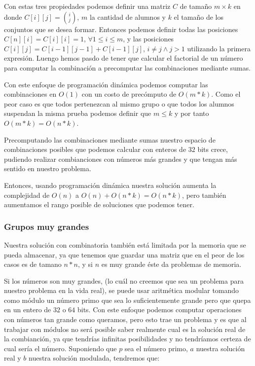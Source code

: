 \documentclass{article}
\begin{document}
Con estas tres propiedades podemos definir una matriz $C$ de tamaño $m \times k$ en donde $C[i][j] = {i \choose j}$, $m$ la cantidad de alumnos y $k$ el tamaño de los conjuntos que se desea formar. Entonces podemos definir todas las posiciones $C[n][i] = C[i][i] = 1$, $\forall 1 \leq i \leq m$, y las posiciones $C[i][j] = C[i - 1][j - 1] + C[i - 1][j]$, $i \neq j \land j > 1$ utilizando la primera expresión. Luengo hemos pasdo de tener que calcular el factorial de un número para computar la combinación a precomputar las combinaciones mediante sumas. 

Con este enfoque de programación dinámica podemos computar las combinaciones en $O(1)$ con un costo de precómputo de $O(m*k)$. Como el peor caso es que todos pertenezcan al mismo grupo o que todos los alumnos suspendan la misma prueba podemos definir que $m \leq k$ y por tanto $O(m*k) = O(n*k)$. 

Precomputando las combinaciones mediante sumas nuestro espacio de combinaciones posibles que podemos calcular con enteros de $32$ bits crece, pudiendo realizar combianciones con números más grandes y que tengan más sentido en nuestro problema.  

Entonces, usando programación dinámica nuestra solución aumenta la complejidad de $O(n)$ a $O(n) + O(n*k) = O(n*k)$, pero también aumentamos el rango posible de soluciones que podemos tener.

\subsubsection{Grupos muy grandes}

Nuestra solución con combinatoria también está limitada por la memoria que se pueda almacenar, ya que tenemos que guardar una matriz que en el peor de los casos es de tamano $n*n$, y si $n$ es muy grande éste da problemas de memoria.

Si los números son muy grandes, (lo cuál no creemos que sea un problema para nuestro problema en la vida real), se puede usar aritmética modular tomando como módulo un número primo que sea lo suficientemente grande pero que quepa en un entero de $32$ o $64$ bits. Con este enfoque podemos computar operaciones con números tan grande como queramos, pero esto trae un problema y es que al trabajar con módulos no será posible saber realmente cual es la solución real de la combianción, ya que tendrías infinitas posibilidades y no tendríamos certeza de cual sería el número. Suponiendo que $p$ sea el número primo, $a$ nuestra solución real y $b$ nuestra solución modulada, tendremos que:
\end{document}
